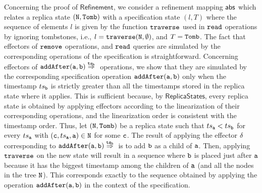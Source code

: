 Concerning the proof of $\mathsf{Refinement}$, we consider a refinement mapping $\mathsf{abs}$ which relates a replica state ${\tt (N,Tomb)}$ with a specification state $(l,T)$ where the sequence of elements $l$ is given by the function ${\tt traverse}$ used in ${\tt read}$ operations by ignoring tombstones, i.e., $l={\tt traverse(N, \emptyset)}$, and $T={\tt Tomb}$. The fact that effectors of ${\tt remove}$ operations, and ${\tt read}$ queries are simulated by the corresponding operations of the specification is straightforward. Concerning effectors of $\alabellongind[{\tt addAfter}]{a,b}{}{\ats_b}{}$ operations, we show that they are simulated by the corresponding specification operation $\alabelshort[{\tt addAfter}]{a,b}$ only when the timestamp $ts_{\tt b}$ is strictly greater than all the timestamps stored in the replica state where it applies. This is sufficient because, by $\mathsf{ReplicaStates}$, every replica state is obtained by applying effectors according to the linearization of their corresponding operations, and the linearization order is consistent with the timestamp order. Thus, let $({\tt N},{\tt Tomb})$ be a replica state such that $ts_{\tt a} < ts_{\tt b}$ for every $ts_{\tt a}$ with $({\tt c},ts_{\tt a},{\tt a})\in {\tt N}$ for some ${\tt c}$. The result of applying the effector $\delta$ corresponding to $\alabellongind[{\tt addAfter}]{a,b}{}{\ats_b}{}$ is to add ${\tt b}$ as a child of ${\tt a}$. Then, applying ${\tt traverse}$ on the new state will result in a sequence where ${\tt b}$ is placed just after ${\tt a}$ because it has the biggest timestamp among the children of ${\tt a}$ (and all the nodes in the tree ${\tt N}$). This corresponds exactly to the sequence obtained by applying the operation $\alabelshort[{\tt addAfter}]{a,b}$ in the context of the specification.

